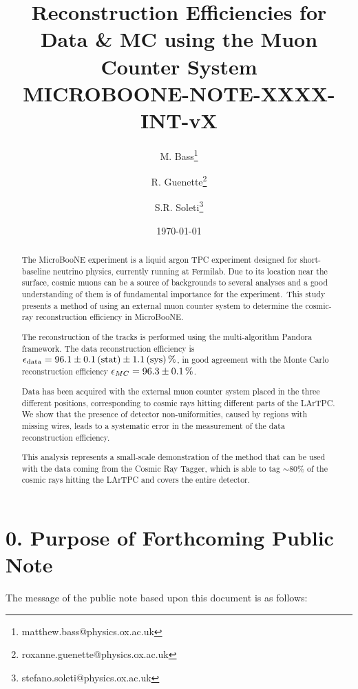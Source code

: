 \documentclass[a4paper]{scrartcl}
\title{Reconstruction Efficiencies for Data \& MC using the Muon Counter System \\ \vspace{1em} \small{\textbf{MICROBOONE-NOTE-XXXX-INT-vX}}}
\author[1]{M. Bass\thanks{matthew.bass@physics.ox.ac.uk}}
\author[1]{R. Guenette\thanks{roxanne.guenette@physics.ox.ac.uk}}
\author[1]{S.R. Soleti\thanks{stefano.soleti@physics.ox.ac.uk}}
\affil[1]{\emph{\small{University of Oxford, Oxford OX1 3RH, United Kingdom}}}
\date{\today}
\begin{document}
\maketitle
\begin{abstract}
  The MicroBooNE experiment is a liquid argon TPC experiment designed for short-baseline neutrino physics, currently running at Fermilab. Due to its location near the surface, cosmic muons can be a source of backgrounds to several analyses and a good understanding of them is of fundamental importance for the experiment. This study presents a method of using an external muon counter system to determine the cosmic-ray reconstruction efficiency in MicroBooNE.

  The reconstruction of the tracks is performed using the multi-algorithm Pandora framework. The data reconstruction efficiency is $\epsilon_{\mathrm{data}}=96.1\pm0.1\thinspace(\mathrm{stat}) \pm 1.1\thinspace(\mathrm{sys})\thinspace\%$, in good agreement with the Monte Carlo reconstruction efficiency $\epsilon_{MC} = 96.3\pm0.1\thinspace\%$.

  Data has been acquired with the external muon counter system placed in the three different positions, corresponding to cosmic rays hitting different parts of the LArTPC. We show that the presence of detector non-uniformities, caused by regions with missing wires, leads to a systematic error in the measurement of the data reconstruction efficiency.

  This analysis represents a small-scale demonstration of the method that can be used with the data coming from the Cosmic Ray Tagger, which is able to tag $\sim80\%$ of the cosmic rays hitting the LArTPC and covers the entire detector.
\end{abstract}

\tableofcontents

\clearpage{}

\section*{0. Purpose of Forthcoming Public Note}

The message of the public note based upon this document is as follows:
\end{document}
